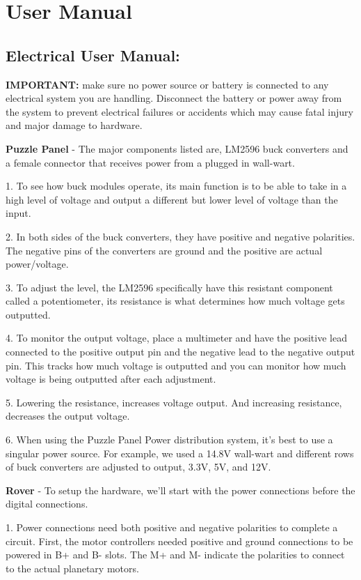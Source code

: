 \documentclass[a4paper, 10pt]{article}
\begin{document}
\section{User Manual}
	\subsection{Electrical User Manual:}

\textbf{IMPORTANT:} make sure no power source or battery is connected to any electrical system you are handling. Disconnect the battery or power away from the system to prevent electrical failures or accidents which may cause fatal injury and major damage to hardware.  

\textbf{Puzzle Panel} - The major components listed are, LM2596 buck converters and a female connector that receives power from a plugged in wall-wart.

1. To see how buck modules operate, its main function is to be able to take in a high level of voltage and output a different but lower level of voltage than the input. 

2. In both sides of the buck converters, they have positive and negative polarities. The negative pins of the converters are ground and the positive are actual power/voltage.  

3. To adjust the level, the LM2596 specifically have this resistant component called a potentiometer, its resistance is what determines how much voltage gets outputted. 

4. To monitor the output voltage, place a multimeter and have the positive lead connected to the positive output pin and the negative lead to the negative output pin. This tracks how much voltage is outputted and you can monitor how much voltage is being outputted after each adjustment.

5. Lowering the resistance, increases voltage output. And increasing resistance, decreases the output voltage. 

6. When using the Puzzle Panel Power distribution system, it's best to use a singular power source. For example, we used a 14.8V wall-wart and different rows of buck converters are adjusted to output, 3.3V, 5V, and 12V.

\textbf{Rover} - To setup the hardware, we'll start with the power connections before the digital connections.

1. Power connections need both positive and negative polarities to complete a circuit. First, the motor controllers needed positive and ground connections to be powered in B+ and B- slots. The M+ and M- indicate the polarities to connect to the actual planetary motors. 
\end{document}
